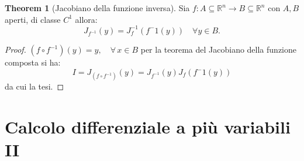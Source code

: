 \documentclass[leqno]{article}
\theoremstyle{definition}
\numberwithin{equation}{section}
\newtheorem{theorem}{Theorem}[section]
\theoremstyle{remark}
\begin{document}
	\begin{theorem}[Jacobiano della funzione inversa]
		Sia $f:A\subseteq \mathbb{R}^n \rightarrow B \subseteq \mathbb{R}^n$ con $A,B$ aperti, di classe $C^1$ allora:
		\begin{equation}
			J_{f^{-1}}(y) = J_f^{-1}(f^-1(y)) \quad \forall y \in B.
		\end{equation}
		\begin{proof}
			$(f\circ f^{-1})(y)=y, \quad \forall \, x \in B$ per la teorema del Jacobiano della funzione composta si ha: 
			\begin{equation}
				I=J_{(f \circ f^{-1})}(y)=J_{f^{-1}}(y)J_f(f^-1(y))
			\end{equation}
			da cui la tesi. 
		\end{proof}
	\end{theorem}
	
	
	\section{Calcolo differenziale a più variabili II}
	
\end{document}
